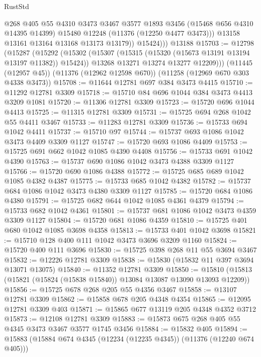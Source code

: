 \begin{lexlean}{RustStd}
\begin{coremodule}
{{{{{{{{{{{{{{{{{{{                @268
                @405
                @55
                @4310
                @3473
                @3467
                @3577
                @1893
                @3456
                (@15468 @656 @4310 @14395 @14399)
                @15480
                @12248
                (@11376 (@12250 @4477 @3473)))
              @13158
              @13161
              @13164
              @13168
              @13173
              @13179))
          @15424)))
    @13188
@15703 := @12798
    (@15287
      (@15292
        (@15302
          (@15307 (@15315 (@15320 (@15673 @13191 @13194 @13197 @11382)) @15424))
          @13268
          @13271
          @13274
          @13277
          @12209)))
    (@11445 (@12957 @45))
    (@11376 (@12962 @12598 @670))
    (@11258 (@12969 @670 @303 @4338 @3473))
@15708 := @11644 @12781 @697 @384 @3473 @4415
@15710 := @11292 @12781 @3309
@15718 := @15710 @84 @696 @1044 @384 @3473 @4413 @3209 @1081
@15720 := @11306 @12781 @3309
@15723 := @15720 @696 @1044 @4413
@15725 := @11315 @12781 @3309
@15731 := @15725 @694 @268 @1042 @55 @4411 @3467
@15733 := @11283 @12781 @3309
@15736 := @15733 @694 @1042 @4411
@15737 := @15710 @97
@15744 := @15737 @693 @1086 @1042 @3473 @4409 @3309 @1127
@15747 := @15720 @693 @1086 @4409
@15753 := @15725 @691 @662 @1042 @1085 @4390 @4408
@15756 := @15733 @691 @1042 @4390
@15763 := @15737 @690 @1086 @1042 @3473 @4388 @3309 @1127
@15766 := @15720 @690 @1086 @4388
@15772 := @15725 @685 @689 @1042 @1085 @4382 @4387
@15775 := @15733 @685 @1042 @4382
@15782 := @15737 @684 @1086 @1042 @3473 @4380 @3309 @1127
@15785 := @15720 @684 @1086 @4380
@15791 := @15725 @682 @644 @1042 @1085 @4361 @4379
@15794 := @15733 @682 @1042 @4361
@15801 := @15737 @681 @1086 @1042 @3473 @4359 @3309 @1127
@15804 := @15720 @681 @1086 @4359
@15810 := @15725 @401 @680 @1042 @1085 @3698 @4358
@15813 := @15733 @401 @1042 @3698
@15821 := @15710 @128 @400 @111 @1042 @3473 @3696 @3209 @1160
@15824 := @15720 @400 @111 @3696
@15830 := @15725 @398 @268 @11 @55 @3694 @3467
@15832 := @12226 @12781 @3309
@15838 := @15830 (@15832 @11 @397 @3694 @13071 @13075)
@15840 := @11352 @12781 @3309
@15850 := @15810 (@15813 (@15821 (@15824 (@15838 @15840)) @13084 @13087 @13090 @13093 @12209))
@15856 := @15725 @678 @268 @205 @55 @4356 @3467
@15858 := @13107 @12781 @3309
@15862 := @15858 @678 @205 @4348 @4354
@15865 := @12095 @12781 @3309 @403
@15871 := @15865 @677 @13119 @205 @4348 @4352 @3712
@15873 := @12108 @12781 @3309
@15883 := @15873 @675 @268 @405 @55 @4345 @3473 @3467 @3577 @1745 @3456
@15884 := @15832 @405
@15894 := @15883 (@15884 @674 @4345 (@12234 (@12235 @4345)) (@11376 (@12240 @674 @405)))
}}}}}}}}}}}}}}}}}}}
\end{coremodule}
\end{lexlean}
